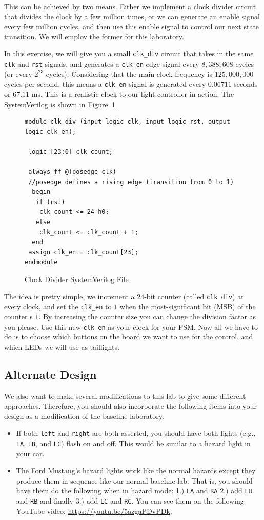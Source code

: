\documentclass{article}
\begin{document}
This can be achieved by two means. Either we implement a clock divider
circuit that divides the clock by a few million times, or we can
generate an enable signal every few million cycles, and then use this
enable signal to control our next state transition.  We will employ
the former for this laboratory.

In this exercise, we will give you a small \verb!clk_div! circuit that takes
in the same \verb!clk! and \verb!rst! signals, and generates a
\verb!clk_en! edge signal
every $8,388,608$ cycles (or every $2^{23}$ cycles). Considering that
the main clock frequency is $125,000,000$ cycles per second, this means
a \verb!clk_en! signal is generated every $0.06711$ seconds
or $67.11$ ms.  This is a realistic clock to our light controller in action.
The SystemVerilog is shown in Figure~\ref{clk_div.sv}
\begin{figure}
\begin{verbatim}
module clk_div (input logic clk, input logic rst, output logic clk_en);

 logic [23:0] clk_count;

 always_ff @(posedge clk)
 //posedge defines a rising edge (transition from 0 to 1)
  begin
   if (rst)
    clk_count <= 24'h0;
   else
    clk_count <= clk_count + 1;
  end
 assign clk_en = clk_count[23];
endmodule
\end{verbatim}
\caption{Clock Divider SystemVerilog File}
\label{clk_div.sv}
\end{figure}

The idea is pretty simple, we increment a $24$-bit counter (called
\verb!clk_div!) at every clock, and set the \verb!clk_en! to $1$ when
the most-significant bit (MSB) of the counter
s $1$. By increasing the counter size you can
change the division factor as you please.  Use this new \verb!clk_en!
as your clock for your FSM.
Now all we have to do is to choose which buttons on the board we want
to use for the control, and which LEDs we will use as
taillights.

\subsection{Alternate Design}

We also want to make several modifications to this lab to give some
different approaches.  Therefore, you should also incorporate the
following items into your design as a modification of the baseline
laboratory.
\begin{itemize}
  \item If both \verb!left! and \verb!right! are both asserted, you
    should have both lights (e.g., \verb!LA!, \verb!LB!, and
    \verb!LC!) flash on and off.  This would be similar to a hazard
    light in your car.
    \item The Ford Mustang's hazard lights work like the normal
      hazards except they produce them in sequence like our normal
      baseline lab.  That is, you should have them do the following
      when in hazard mode: 1.) \verb!LA! and \verb!RA! 2.) add
      \verb!LB! and \verb!RB! and finally 3.) add \verb!LC! and
      \verb!RC!.  You can see them on the following YouTube video:
      \url{https://youtu.be/5azgaPDvPDk}.
\end{itemize}
\end{document}

